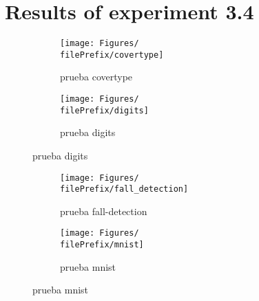 
\newcommand{\major}{3}
\newcommand{\minor}{4}

\newcommand{\undPrefix}{\major_\minor}
\newcommand{\dotPrefix}{\major.\minor}
\newcommand{\scoPrefix}{\major-\minor}
\newcommand{\filePrefix}{\undPrefix}

\chapter{Results of experiment \dotPrefix} %


\label{Appendix\scoPrefix} %


\begin{figure}[ht]
  \centering
  \begin{subfigure}[b]{0.5\linewidth}
    \centering\texttt{[image: Figures/\\filePrefix/covertype]}
    \caption{prueba covertype}
    \label{fig:\undPrefix_covertype}
  \end{subfigure}%
  \begin{subfigure}[b]{0.5\linewidth}
    \centering\texttt{[image: Figures/\\filePrefix/digits]}
    \caption{prueba digits}
    \label{fig:\undPrefix_digits}
  \end{subfigure}
\end{figure}


\begin{figure}[ht]
  \centering
  \begin{subfigure}[b]{0.5\linewidth}
    \centering\texttt{[image: Figures/\\filePrefix/fall\_detection]}
    \caption{prueba fall-detection}
    \label{fig:\undPrefix_fall_detection}
  \end{subfigure}%
  \begin{subfigure}[b]{0.5\linewidth}
    \centering\texttt{[image: Figures/\\filePrefix/mnist]}
    \caption{prueba mnist}
    \label{fig:\undPrefix_mnist}
  \end{subfigure}
\end{figure}


